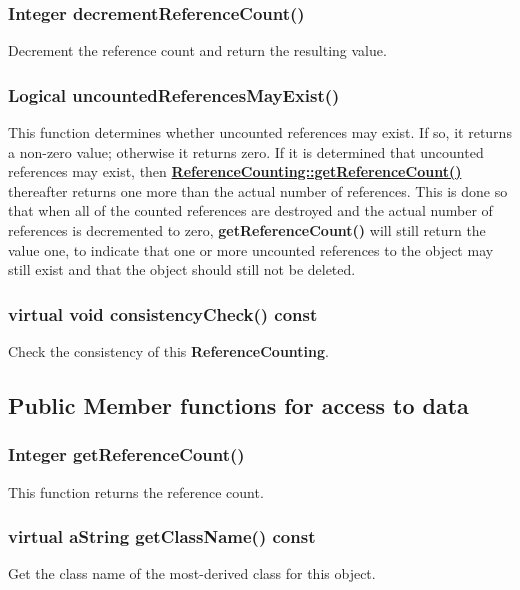\documentclass{article}
\begin{document}
  \subsubsection{Integer decrementReferenceCount()}
  \label{ReferenceCounting::decrementReferenceCount()}
    Decrement the reference count and return the resulting value.

  \subsubsection{Logical uncountedReferencesMayExist()}
  \label{ReferenceCounting::uncountedReferencesMayExist()}
    This function determines whether uncounted references may exist.
    If so, it returns a non-zero value; otherwise it returns zero.
    If it is determined that uncounted references may exist, then
    {\bf{}\hyperref{getReferenceCount()}{getReferenceCount() \rm(\S}{)}{ReferenceCounting::getReferenceCount()}}
    thereafter returns one more than the actual number of references.  This is done so that when all of the counted references are destroyed and
    the actual number of references is decremented to zero, \textbf{getReferenceCount()} will still return the value one, to indicate that one
    or more uncounted references to the object may still exist and that the object should still not be deleted.

  \subsubsection{virtual void consistencyCheck() const}
  \label{ReferenceCounting::consistencyCheck() const}
    Check the consistency of this \textbf{ReferenceCounting}.

\subsection{Public Member functions for access to data}
\label{ReferenceCounting::PublicAccessToData}

  \subsubsection{Integer getReferenceCount()}
  \label{ReferenceCounting::getReferenceCount()}
    This function returns the reference count.

  \subsubsection{virtual aString getClassName() const}
  \label{ReferenceCounting::getClassName() const}
    Get the class name of the most-derived class for this object.
\end{document}
